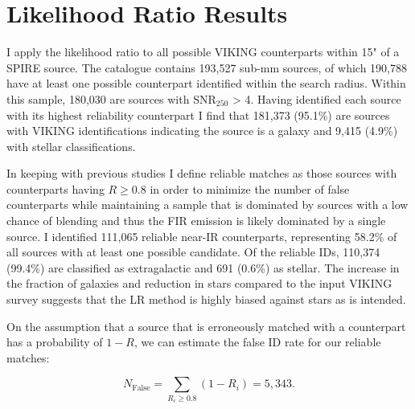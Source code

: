 \section{Likelihood Ratio Results}

I apply the likelihood ratio to all possible VIKING counterparts within 15" of a SPIRE source. The catalogue contains 193,527 sub-mm sources, of which 190,788 have at least one possible counterpart identified within the search radius. Within this sample, 180,030 are sources with SNR$_{250}$ > 4. Having identified each source with its highest reliability counterpart I find that 181,373 (95.1\%) are sources with VIKING identifications indicating the source is a galaxy and 9,415 (4.9\%) with stellar classifications. 

In keeping with previous studies I define reliable matches as those sources with counterparts having $R \geq 0.8$ in order to minimize the number of false counterparts while maintaining a sample that is dominated by sources with a low chance of blending and thus the FIR emission is likely dominated by a single source. I identified 111,065 reliable near-IR counterparts, representing 58.2\% of all sources with at least one possible candidate. Of the reliable IDs, 110,374 (99.4\%) are classified as extragalactic and 691 (0.6\%) as stellar. The increase in the fraction of galaxies and reduction in stars compared to the input VIKING survey suggests that the LR method is highly biased against stars as is intended.

On the assumption that a source that is erroneously matched with a counterpart has a probability of $1 - R$, we can estimate the false ID rate for our reliable matches:

\begin{equation}
    N_{\textrm{False}} = \sum_{R_i \geq 0.8} (1 - R_i) = 5,343.
\label{eq:false_ids}
\end{equation}

